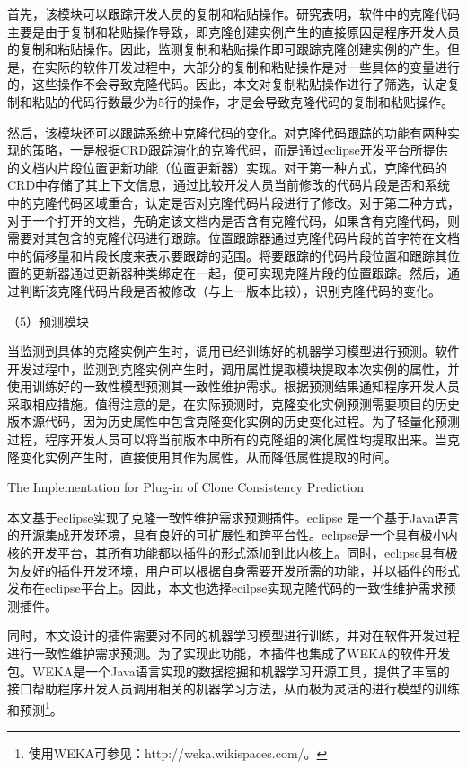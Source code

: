 首先，该模块可以跟踪开发人员的复制和粘贴操作。研究表明，软件中的克隆代码主要是由于复制和粘贴操作导致，即克隆创建实例产生的直接原因是程序开发人员的复制和粘贴操作。因此，监测复制和粘贴操作即可跟踪克隆创建实例的产生。但是，在实际的软件开发过程中，大部分的复制和粘贴操作是对一些具体的变量进行的，这些操作不会导致克隆代码。因此，本文对复制粘贴操作进行了筛选，认定复制和粘贴的代码行数最少为5行的操作，才是会导致克隆代码的复制和粘贴操作。

然后，该模块还可以跟踪系统中克隆代码的变化。对克隆代码跟踪的功能有两种实现的策略，一是根据CRD跟踪演化的克隆代码，而是通过eclipse开发平台所提供的文档内片段位置更新功能（位置更新器）实现。对于第一种方式，克隆代码的CRD中存储了其上下文信息，通过比较开发人员当前修改的代码片段是否和系统中的克隆代码区域重合，认定是否对克隆代码片段进行了修改。对于第二种方式，对于一个打开的文档，先确定该文档内是否含有克隆代码，如果含有克隆代码，则需要对其包含的克隆代码进行跟踪。位置跟踪器通过克隆代码片段的首字符在文档中的偏移量和片段长度来表示要跟踪的范围。将要跟踪的代码片段位置和跟踪其位置的更新器通过更新器种类绑定在一起，便可实现克隆片段的位置跟踪。然后，通过判断该克隆代码片段是否被修改（与上一版本比较），识别克隆代码的变化。

（5）预测模块

当监测到具体的克隆实例产生时，调用已经训练好的机器学习模型进行预测。软件开发过程中，监测到克隆实例产生时，调用属性提取模块提取本次实例的属性，并使用训练好的一致性模型预测其一致性维护需求。根据预测结果通知程序开发人员采取相应措施。值得注意的是，在实际预测时，克隆变化实例预测需要项目的历史版本源代码，因为历史属性中包含克隆变化实例的历史变化过程。为了轻量化预测过程，程序开发人员可以将当前版本中所有的克隆组的演化属性均提取出来。当克隆变化实例产生时，直接使用其作为属性，从而降低属性提取的时间。

{The Implementation for Plug-in of Clone Consistency Prediction}

本文基于eclipse实现了克隆一致性维护需求预测插件。eclipse 是一个基于Java语言的开源集成开发环境，具有良好的可扩展性和跨平台性。eclipse是一个具有极小内核的开发平台，其所有功能都以插件的形式添加到此内核上。同时，eclipse具有极为友好的插件开发环境，用户可以根据自身需要开发所需的功能，并以插件的形式发布在eclipse平台上。因此，本文也选择ecilpse实现克隆代码的一致性维护需求预测插件。

同时，本文设计的插件需要对不同的机器学习模型进行训练，并对在软件开发过程进行一致性维护需求预测。为了实现此功能，本插件也集成了WEKA的软件开发包。WEKA是一个Java语言实现的数据挖掘和机器学习开源工具，提供了丰富的接口帮助程序开发人员调用相关的机器学习方法，从而极为灵活的进行模型的训练和预测\footnote{使用WEKA可参见：http://weka.wikispaces.com/。}。

